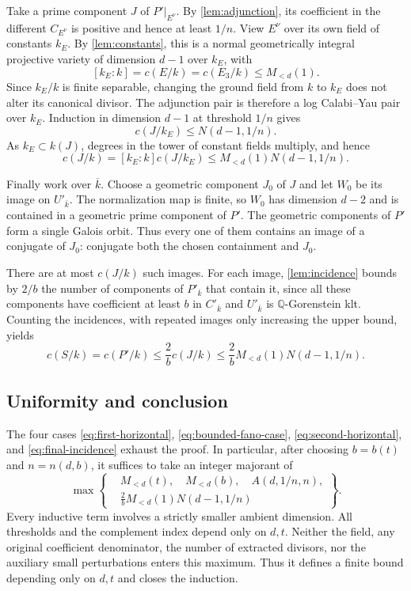 \documentclass[11pt]{article}
\numberwithin{equation}{section}
\theoremstyle{definition}
\newcommand{\Q}{\mathbb Q}
\newcommand{\kb}{\overline{k}}
\newcommand{\cdeg}[2]{c(#1/#2)}
\begin{document}
Take a prime component $J$ of $P'|_{E^\nu}$. By
\cref{lem:adjunction}, its coefficient in the different
$C_{E^\nu}$ is positive and hence at least $1/n$. View $E^\nu$
over its own field of constants $k_E$. By \cref{lem:constants},
this is a normal geometrically integral projective variety of
dimension $d-1$ over $k_E$, with
\[
 [k_E:k]=\cdeg{E}{k}=\cdeg{E_3}{k}\leq M_{<d}(1).
\]
Since $k_E/k$ is finite separable, changing the ground field from
$k$ to $k_E$ does not alter its canonical divisor. The adjunction
pair is therefore a log Calabi--Yau pair over $k_E$. Induction in
dimension $d-1$ at threshold $1/n$ gives
\[
 \cdeg{J}{k_E}\leq N(d-1,1/n).
\]
As $k_E\subset k(J)$, degrees in the tower of constant fields
multiply, and hence
\begin{equation}\label{eq:Jbound}
 \cdeg{J}{k}=[k_E:k]\cdeg{J}{k_E}
 \leq M_{<d}(1)N(d-1,1/n).
\end{equation}

Finally work over $\kb$. Choose a geometric component $J_0$ of
$J$ and let $W_0$ be its image on $U'_{\kb}$. The normalization
map is finite, so $W_0$ has dimension $d-2$ and is contained in
a geometric prime component of $P'$. The geometric components
of $P'$ form a single Galois orbit. Thus every one of them
contains an image of a conjugate of $J_0$: conjugate both the
chosen containment and $J_0$.

There are at most $\cdeg{J}{k}$ such images. For each image,
\cref{lem:incidence} bounds by $2/b$ the number of components
of $P'_{\kb}$ that contain it, since all these components have
coefficient at least $b$ in $C'_{\kb}$ and $U'_{\kb}$ is
$\Q$-Gorenstein klt. Counting the incidences, with repeated images
only increasing the upper bound, yields
\begin{equation}\label{eq:final-incidence}
 \cdeg{S}{k}=\cdeg{P'}{k}
 \leq\frac2b\cdeg{J}{k}
 \leq\frac2b M_{<d}(1)N(d-1,1/n).
\end{equation}

\subsection{Uniformity and conclusion}

The four cases \eqref{eq:first-horizontal},
\eqref{eq:bounded-fano-case}, \eqref{eq:second-horizontal}, and
\eqref{eq:final-incidence} exhaust the proof. In particular, after
choosing $b=b(t)$ and $n=n(d,b)$, it suffices to take an integer
majorant of
\begin{equation}\label{eq:recurrence}
 \max\left\{
 \begin{aligned}
 &M_{<d}(t),\quad M_{<d}(b),\quad A(d,1/n,n),\\
 &\frac2b M_{<d}(1)N(d-1,1/n)
 \end{aligned}\right\}.
\end{equation}
Every inductive term involves a strictly smaller ambient dimension.
All thresholds and the complement index depend only on $d,t$.
Neither the field, any original coefficient denominator, the number
of extracted divisors, nor the auxiliary small perturbations enters
this maximum. Thus it defines a finite bound depending only on
$d,t$ and closes the induction.
\end{document}
